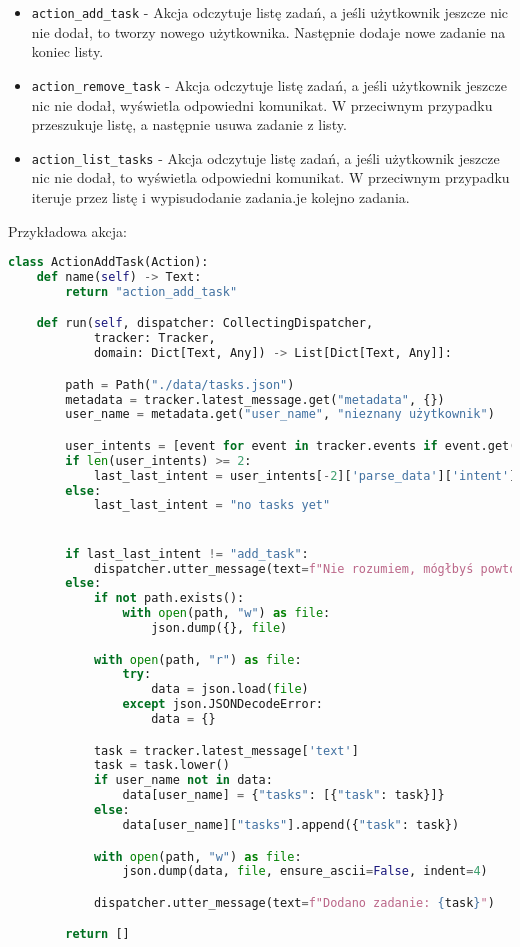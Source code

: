 \documentclass{article}
\begin{document}
\begin{itemize}
    \item[\textcolor{violet}{\textbullet}] \verb|action_add_task| - Akcja odczytuje listę zadań, a jeśli
        użytkownik jeszcze nic nie dodał, to tworzy nowego użytkownika.
        Następnie dodaje nowe zadanie na koniec listy.
    \item[\textcolor{violet}{\textbullet}] \verb|action_remove_task| - Akcja odczytuje listę zadań, a jeśli
        użytkownik jeszcze nic nie dodał, wyświetla odpowiedni komunikat.
        W przeciwnym przypadku przeszukuje listę, a następnie usuwa zadanie
        z listy.
    \item[\textcolor{violet}{\textbullet}] \verb|action_list_tasks| - Akcja odczytuje listę zadań, a jeśli
        użytkownik jeszcze nic nie dodał, to wyświetla odpowiedni komunikat.
        W przeciwnym przypadku iteruje przez listę i wypisudodanie zadania.je kolejno zadania.
\end{itemize}
Przykładowa akcja:
\begin{lstlisting}[language=Python, caption=Akcja dodawania]
class ActionAddTask(Action):
    def name(self) -> Text:
        return "action_add_task"

    def run(self, dispatcher: CollectingDispatcher,
            tracker: Tracker,
            domain: Dict[Text, Any]) -> List[Dict[Text, Any]]:

        path = Path("./data/tasks.json")
        metadata = tracker.latest_message.get("metadata", {})
        user_name = metadata.get("user_name", "nieznany użytkownik")

        user_intents = [event for event in tracker.events if event.get("event") == "user"]
        if len(user_intents) >= 2:
            last_last_intent = user_intents[-2]['parse_data']['intent']['name']
        else:
            last_last_intent = "no tasks yet"


        if last_last_intent != "add_task":
            dispatcher.utter_message(text=f"Nie rozumiem, mógłbyś powtórzyć?")
        else:
            if not path.exists():
                with open(path, "w") as file:
                    json.dump({}, file)

            with open(path, "r") as file:
                try:
                    data = json.load(file)
                except json.JSONDecodeError:
                    data = {}

            task = tracker.latest_message['text']
            task = task.lower()
            if user_name not in data:
                data[user_name] = {"tasks": [{"task": task}]}
            else:
                data[user_name]["tasks"].append({"task": task})

            with open(path, "w") as file:
                json.dump(data, file, ensure_ascii=False, indent=4)

            dispatcher.utter_message(text=f"Dodano zadanie: {task}")

        return []
\end{lstlisting}
\end{document}
